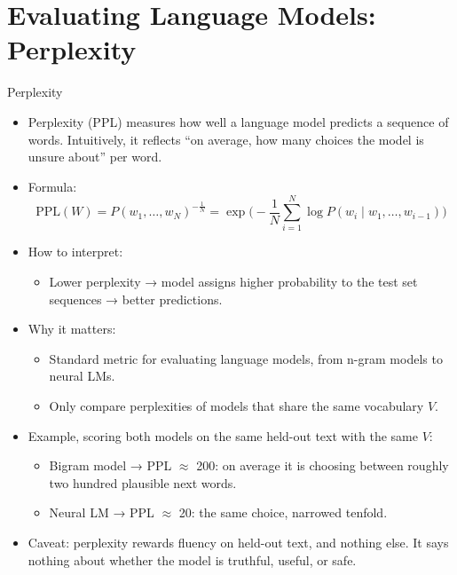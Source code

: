 \section{Evaluating Language Models: Perplexity}

\begin{frame}[allowframebreaks]{Perplexity}

\begin{itemize}
    \item Perplexity (PPL) measures how well a language model predicts a sequence of words.
    Intuitively, it reflects ``on average, how many choices the model is unsure about'' per word.

    \item Formula:
    \[
        \text{PPL}(W) = P(w_1, \dots, w_N)^{-\frac{1}{N}}
        = \exp\Bigg(-\frac{1}{N} \sum_{i=1}^{N} \log P(w_i \mid w_1, \dots, w_{i-1}) \Bigg)
    \]

    \item How to interpret:
    \begin{itemize}
        \item Lower perplexity → model assigns higher probability to the test set sequences → better predictions.
    \end{itemize}
\framebreak
    \item Why it matters:
    \begin{itemize}
        \item Standard metric for evaluating language models, from n-gram models to neural LMs.
        \item Only compare perplexities of models that share the same vocabulary $V$.
    \end{itemize}

    \item Example, scoring both models on the same held-out text with the same $V$:
    \begin{itemize}
        \item Bigram model → PPL $\approx$ 200: on average it is choosing between
        roughly two hundred plausible next words.
        \item Neural LM → PPL $\approx$ 20: the same choice, narrowed tenfold.
    \end{itemize}

    \item Caveat: perplexity rewards fluency on held-out text, and nothing else. It
    says nothing about whether the model is truthful, useful, or safe.
\end{itemize}

\end{frame}
